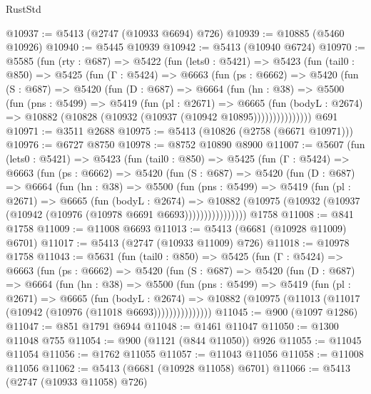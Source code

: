 \begin{lexlean}{RustStd}
\begin{coremodule}
@10937 := @5413 (@2747 (@10933 @6694) @726)
@10939 := @10885 (@5460 @10926)
@10940 := @5445 @10939
@10942 := @5413 (@10940 @6724)
@10970 := @5585
    (fun (rty : @687) =>
    @5422
      (fun (lets0 : @5421) =>
      @5423
        (fun (tail0 : @850) =>
        @5425
          (fun (Γ : @5424) =>
          @6663
            (fun (ps : @6662) =>
            @5420
              (fun (S : @687) =>
              @5420
                (fun (D : @687) =>
                @6664
                  (fun (hn : @38) =>
                  @5500
                    (fun (pns : @5499) =>
                    @5419
                      (fun (pl : @2671) =>
                      @6665
                        (fun (bodyL : @2674) =>
                        @10882 (@10828 (@10932 (@10937 (@10942 @10895)))))))))))))))
    @691
@10971 := @3511 @2688
@10975 := @5413 (@10826 (@2758 (@6671 @10971)))
@10976 := @6727 @8750
@10978 := @8752 @10890 @8900
@11007 := @5607
    (fun (lets0 : @5421) =>
    @5423
      (fun (tail0 : @850) =>
      @5425
        (fun (Γ : @5424) =>
        @6663
          (fun (ps : @6662) =>
          @5420
            (fun (S : @687) =>
            @5420
              (fun (D : @687) =>
              @6664
                (fun (hn : @38) =>
                @5500
                  (fun (pns : @5499) =>
                  @5419
                    (fun (pl : @2671) =>
                    @6665
                      (fun (bodyL : @2674) =>
                      @10882
                        (@10975 (@10932 (@10937 (@10942 (@10976 (@10978 @6691 @6693))))))))))))))))
    @1758
@11008 := @841 @1758
@11009 := @11008 @6693
@11013 := @5413 (@6681 (@10928 @11009) @6701)
@11017 := @5413 (@2747 (@10933 @11009) @726)
@11018 := @10978 @1758
@11043 := @5631
    (fun (tail0 : @850) =>
    @5425
      (fun (Γ : @5424) =>
      @6663
        (fun (ps : @6662) =>
        @5420
          (fun (S : @687) =>
          @5420
            (fun (D : @687) =>
            @6664
              (fun (hn : @38) =>
              @5500
                (fun (pns : @5499) =>
                @5419
                  (fun (pl : @2671) =>
                  @6665
                    (fun (bodyL : @2674) =>
                    @10882 (@10975 (@11013 (@11017 (@10942 (@10976 (@11018 @6693)))))))))))))))
@11045 := @900 (@1097 @1286)
@11047 := @851 @1791 @6944
@11048 := @1461 @11047
@11050 := @1300 @11048 @755
@11054 := @900 (@1121 (@844 @11050)) @926
@11055 := @11045 @11054
@11056 := @1762 @11055
@11057 := @11043 @11056
@11058 := @11008 @11056
@11062 := @5413 (@6681 (@10928 @11058) @6701)
@11066 := @5413 (@2747 (@10933 @11058) @726)

\end{coremodule}
\end{lexlean}
